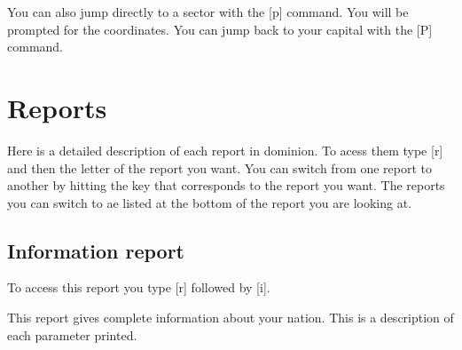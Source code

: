 You can also jump directly to a sector with the [p] command.  You will
be prompted for the coordinates.  You can jump back to your capital
with the [P] command.

\section{Reports}
Here is a detailed description of each report in dominion. To acess
them type [r] and then the letter of the report you want.  You can
switch from one report to another by hitting the key that corresponds
to the report you want.  The reports you can switch to ae listed at
the bottom of the report you are looking at.

\subsection{Information report}
To access this report you type [r] followed by [i].

This report gives complete information about your nation.  This is a
description of each parameter printed.

